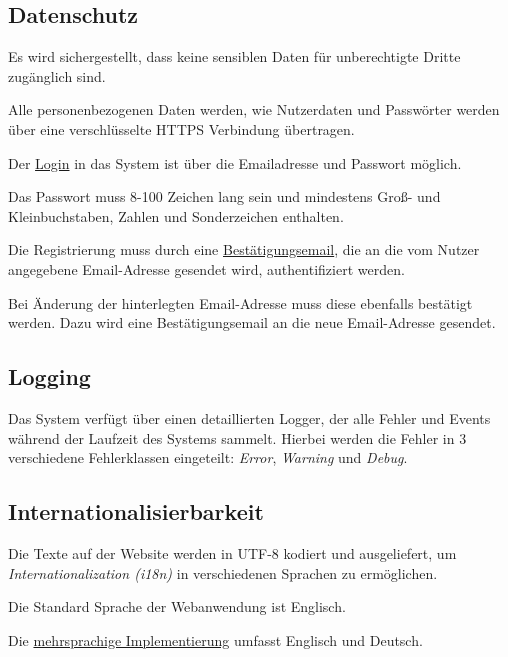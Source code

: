 \subsection{Datenschutz}

\begin{description}
	 Es wird sichergestellt, dass keine sensiblen Daten für unberechtigte Dritte zugänglich sind.

	 Alle personenbezogenen Daten werden, wie Nutzerdaten und Passwörter werden über eine verschlüsselte HTTPS Verbindung übertragen.

	 Der \hyperref[funkt:080]{Login} in das System ist über die Emailadresse und Passwort möglich.

	 Das Passwort muss 8-100 Zeichen lang sein und mindestens Groß- und Kleinbuchstaben, Zahlen und Sonderzeichen enthalten.

	 Die Registrierung muss durch eine \hyperref[funkt:060]{Bestätigungsemail}, die an die vom Nutzer angegebene Email-Adresse gesendet wird, authentifiziert werden.

	 Bei Änderung der hinterlegten Email-Adresse muss diese ebenfalls bestätigt werden. Dazu wird eine Bestätigungsemail an die neue Email-Adresse gesendet.
\end{description}

\subsection{Logging}

\begin{description}
	 Das System verfügt über einen detaillierten Logger, der alle Fehler und Events während der Laufzeit des Systems sammelt. Hierbei werden die Fehler in 3 verschiedene Fehlerklassen eingeteilt: \emph{Error}, \emph{Warning} und \emph{Debug}.
\end{description}

\subsection{Internationalisierbarkeit}

\begin{description}
	 Die Texte auf der Website werden in UTF-8 kodiert
	und ausgeliefert, um \textit{Internationalization (i18n)} in verschiedenen Sprachen zu ermöglichen.

	 Die Standard Sprache der Webanwendung ist Englisch.

	 Die \hyperref[funkt:020]{mehrsprachige Implementierung} umfasst Englisch und Deutsch.
 \end{description}

